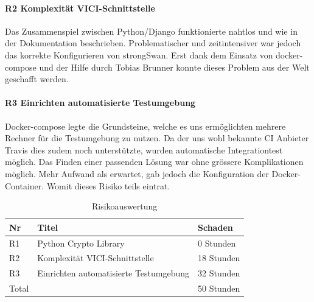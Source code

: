 \paragraph{R2 Komplexität VICI-Schnittstelle} Das Zusammenspiel zwischen Python/Django funktionierte nahtlos und wie in der Dokumentation beschrieben. Problematischer und zeitintensiver war jedoch das korrekte Konfigurieren von strongSwan. Erst dank dem Einsatz von docker-compose und der Hilfe durch Tobias Brunner konnte dieses Problem aus der Welt geschafft werden.

\paragraph{R3 Einrichten automatisierte Testumgebung}
Docker-compose legte die Grundsteine, welche es uns ermöglichten mehrere Rechner für die Testumgebung zu nutzen. Da der uns wohl bekannte CI Anbieter Travis dies zudem noch unterstützte, wurden automatische Integrationtest möglich. Das Finden einer passenden Lösung war ohne grössere Komplikationen möglich. Mehr Aufwand als erwartet, gab jedoch die Konfiguration der Docker-Container. Womit dieses Risiko teils eintrat.\\
\medskip
\begin{table}[H]
	\centering
    \begin{tabular}{|p{2cm}|l|p{2cm}|}
    \hline    
    \rowcolor{lightblue}
	Nr & Titel & Schaden \\ \hline   
	R1 & Python Crypto Library & 0 Stunden \\ \hline
	R2 & Komplexität VICI-Schnittstelle & 18 Stunden \\ \hline
	R3 & Einrichten automatisierte Testumgebung & 32 Stunden \\ \hline
	\rowcolor{lightblue}
	Total &  & 50 Stunden \\ \hline
    \end{tabular}
    \caption[Risikoauswertung]{Risikoauswertung}
\end{table}
